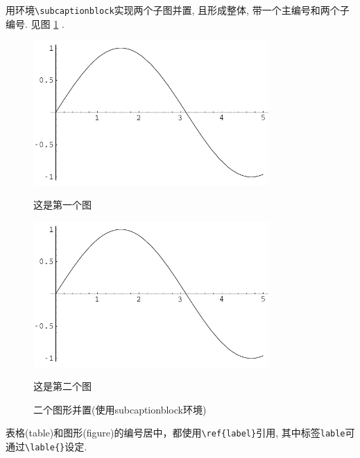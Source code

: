 \documentclass[Chinese]{APSart}
\begin{document}
\begin{example}
用环境\verb/\subcaptionblock/实现两个子图并置, 且形成整体, 带一个主编号和两个子编号. 见图 \ref{mini:subfigures} . 		
\begin{figure}[H]
	\centering
	\begin{subcaptionblock}{0.45\textwidth}	
		\centering
		\includegraphics[width=0.8\textwidth]{figs/sin.pdf}
		\caption{这是第一个图}\label{mini:sube} 
	\end{subcaptionblock}%
	\begin{subcaptionblock}{0.45\textwidth}	
		\centering
		\includegraphics[width=0.8\textwidth]{figs/sin.pdf}
		\caption{这是第二个图}\label{mini:subf} 
	\end{subcaptionblock}	
	\caption{二个图形并置(使用subcaptionblock环境)}\label{mini:subfigures} 
\end{figure}
\end{example}

\begin{remark}
表格(table)和图形(figure)的编号居中，都使用\verb|\ref{label}|引用, 其中标签\texttt{lable}可通过\verb=\lable{}=设定.
\end{remark}
\end{document}
